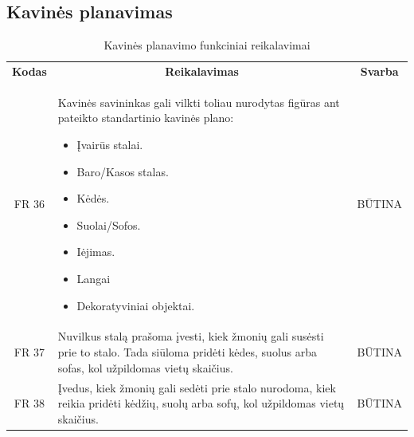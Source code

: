\documentclass{VUMIFPSkursinis}
\begin{document}
{{{{{\begin{center}
\begin{table}[H]
\begin{tabular}{|p{2cm}|p{}|p{}|}
	\end{tabular}		
	
	\label{table:KavinėsĮvertinimas}
	\end{table}


\end{center}
\pagebreak

\subsection{Kavinės planavimas}
\begin{center}
	\begin{table}[H]
	\caption{Kavinės planavimo funkciniai reikalavimai}
	\begin{tabular}{|p{2cm}|p{}|p{}|}
	
	\hline
	    \rowcolor{lightgray}
		\multicolumn{3}{|c|}{Kavinės planavimas}\\
		
	\hline
		\multicolumn{1}{|c|}{{\bfseries Kodas}}&
		\multicolumn{1}{|c|}{{\bfseries Reikalavimas}}&
		\multicolumn{1}{|c|}{{\bfseries Svarba}}\\

	\hline
		\multicolumn{1}{|c|}{FR 36}&
		{Kavinės savininkas gali vilkti toliau nurodytas figūras ant pateikto standartinio kavinės plano:
		\begin{itemize}
			\item Įvairūs stalai.
			\item Baro/Kasos stalas.
			\item Kėdės.
			\item Suolai/Sofos.
			\item Iėjimas.
			\item Langai
			\item Dekoratyviniai objektai.
		\end{itemize}}&
		\multicolumn{1}{|c|}{BŪTINA}\\

	\hline
	
		\multicolumn{1}{|c|}{FR 37}&
		{Nuvilkus stalą prašoma įvesti, kiek žmonių gali susėsti prie to stalo. Tada siūloma pridėti kėdes, suolus arba sofas, kol užpildomas vietų skaičius.}&
		\multicolumn{1}{|c|}{BŪTINA}\\				
	\hline
	
		\multicolumn{1}{|c|}{FR 38}&
		{Įvedus, kiek žmonių gali sedėti prie stalo nurodoma, kiek reikia pridėti kėdžių, suolų arba sofų, kol užpildomas vietų skaičius.}&
		\multicolumn{1}{|c|}{BŪTINA}\\				
	\hline
	

\end{tabular}
\end{table}
\end{center}}}}}}
\end{document}
